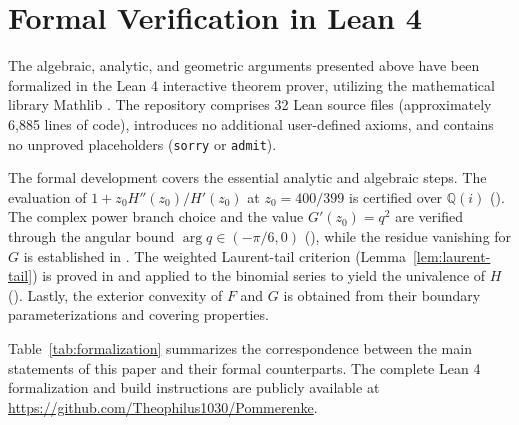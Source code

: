 \documentclass[11pt,reqno]{amsart}
\theoremstyle{definition}
\begin{document}
\section{Formal Verification in Lean 4}\label{sec:formalization}

The algebraic, analytic, and geometric arguments presented above have been formalized in the \textsf{Lean 4} interactive theorem prover, utilizing the mathematical library \textsf{Mathlib} \cite{Mathlib}. The repository comprises 32 Lean source files (approximately 6,885 lines of code), introduces no additional user-defined axioms, and contains no unproved placeholders (\texttt{sorry} or \texttt{admit}).

The formal development covers the essential analytic and algebraic steps. The evaluation of $1 + z_0 H''(z_0)/H'(z_0)$ at $z_0 = 400/399$ is certified over $\mathbb{Q}(i)$ (). The complex power branch choice and the value $G'(z_0) = q^2$ are verified through the angular bound $\arg q \in (-\pi/6, 0)$ (), while the residue vanishing for $G$ is established in . The weighted Laurent-tail criterion (Lemma~\ref{lem:laurent-tail}) is proved in  and applied to the binomial series to yield the univalence of $H$ (). Lastly, the exterior convexity of $F$ and $G$ is obtained from their boundary parameterizations and covering properties.

Table~\ref{tab:formalization} summarizes the correspondence between the main statements of this paper and their formal counterparts. The complete \textsf{Lean 4} formalization and build instructions are publicly available at \url{https://github.com/Theophilus1030/Pommerenke}.
\end{document}
